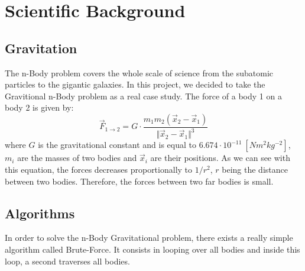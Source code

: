 \documentclass[10pt,a4paper]{article}
\begin{document}



\section{Scientific Background}

\subsection{Gravitation} 

The n-Body problem covers the whole scale of science from the subatomic particles to the gigantic galaxies. In this project, we decided to take the Gravitional n-Body problem as a real case study. The force\cite{grav} of a body 1 on a body 2 is given by:
\begin{equation}
\vec{F}_{1\rightarrow 2} = G\cdot\frac{m_1m_2(\vec{x}_2-\vec{x}_1)}{\Vert \vec{x}_2-\vec{x}_1\Vert^3}
\end{equation}
where $G$ is the gravitational constant and is equal to $6.674 \cdot 10^{-11}~[Nm^2kg^{-2}]$, $m_i$ are the masses of two bodies and $\vec{x}_i$ are their positions. As we can see with this equation, the forces decreases proportionally to $1/r^2$, $r$ being the distance between two bodies. Therefore, the forces between two far bodies is small.

\subsection{Algorithms}

In order to solve the n-Body Gravitational problem, there exists a really simple algorithm called Brute-Force. It consists in looping over all bodies and inside this loop, a second traverses all bodies.
\end{document}
